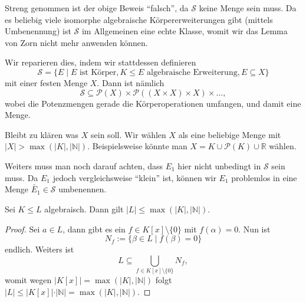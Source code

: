 \begin{remark}
    Streng genommen ist der obige Beweis ``falsch'', da $\mathcal{S}$ keine Menge sein muss. Da es beliebig viele isomorphe algebraische Körpererweiterungen gibt (mittels Umbenennung) ist $\mathcal{S}$ im Allgemeinen eine echte Klasse, womit wir das Lemma von Zorn nicht mehr anwenden können.

    Wir reparieren dies, indem wir stattdessen definieren
    $$ \mathcal{S} = \{ E \mid E \text{ ist Körper}, K \leq E \text{ algebraische Erweiterung}, E \subseteq X \} $$
    mit einer festen Menge $X$. Dann ist nämlich
    $$ \mathcal{S} \subseteq \mathcal{P}(X) \times \mathcal{P}((X \times X) \times X) \times \hdots, $$
    wobei die Potenzmengen gerade die Körperoperationen umfangen, und damit eine Menge.

    Bleibt zu klären was $X$ sein soll. Wir wählen $X$ als eine beliebige Menge mit $\vert X \vert > \max(\vert K \vert, \vert \mathbb{N} \vert)$. Beispielsweise könnte man $X = K \cup \mathcal{P}(K) \cup \mathbb{R}$ wählen.

    Weiters muss man noch darauf achten, dass $E_1$ hier nicht unbedingt in $\mathcal{S}$ sein muss. Da $E_1$ jedoch vergleichsweise ``klein'' ist, können wir $E_1$ problemlos in eine Menge $\widetilde{E_1} \in \mathcal{S}$ umbenennen.
\end{remark}

\begin{proposition}
    Sei $K \leq L$ algebraisch. Dann gilt $\vert L \vert \leq \max(\vert K \vert, \vert \mathbb{N} \vert)$.
\end{proposition}

\begin{proof}
    Sei $a \in L$, dann gibt es ein $f \in K[x] \setminus \{0\}$ mit $f(\alpha) = 0$. Nun ist
    $$ N_f := \{ \beta \in L \mid f(\beta) = 0 \} $$
    endlich. Weiters ist
    $$ L \subseteq \bigcup_{f \in K[x] \setminus \{0\}} N_f, $$
    womit wegen $\vert K[x] \vert = \max(\vert K \vert, \vert \mathbb{N} \vert)$ folgt $\vert L \vert \leq \vert K[x] \vert \cdot \vert \mathbb{N} \vert = \max(\vert K \vert, \vert \mathbb{N} \vert)$.
\end{proof}


